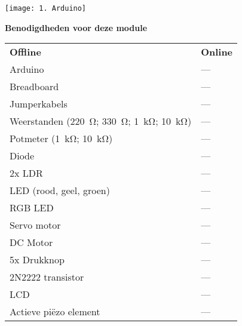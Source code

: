 \documentclass{arduino}
\begin{document}
\texttt{[image: 1. Arduino]}

\textbf{Benodigdheden voor deze module}

\begin{tabular}{p{}p{}}
\textbf{Offline}                                                                    & \textbf{Online} \\
Arduino                                                                             & ---             \\
Breadboard                                                                          & ---             \\
Jumperkabels                                                                        & ---             \\
Weerstanden (\SI{220}{\ohm}; \SI{330}{\ohm}; \SI{1}{\kilo\ohm}; \SI{10}{\kilo\ohm}) & ---             \\
Potmeter (\SI{1}{\kilo\ohm}; \SI{10}{\kilo\ohm})                                    & ---             \\
Diode                                                                               & ---             \\
2x LDR                                                                              & ---             \\
LED (rood, geel, groen)                                                             & ---             \\
RGB LED                                                                             & ---             \\
Servo motor                                                                         & ---             \\
DC Motor                                                                            & ---             \\
5x Drukknop                                                                         & ---             \\
2N2222 transistor                                                                   & ---             \\
LCD                                                                                 & ---             \\
Actieve piëzo element                                                               & ---             \\
\end{tabular}
\end{document}
